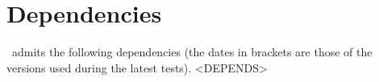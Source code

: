 \documentclass{tutodoc}
\begin{document}
\section{Dependencies}

\thisproj\ admits the following dependencies (the dates in brackets are those of the versions used during the latest tests).
<DEPENDS>
\end{document}
